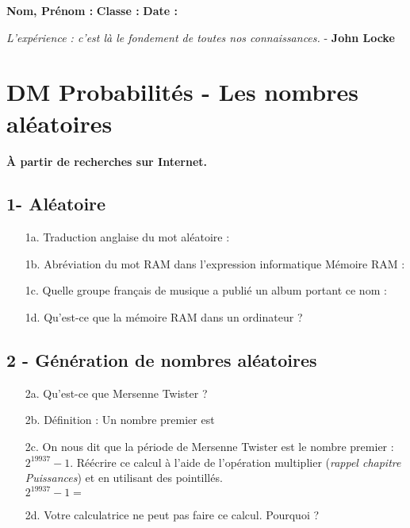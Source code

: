 



\textbf{Nom, Prénom :} \hspace{8cm} \textbf{Classe :} \hspace{3cm} \textbf{Date :}\\

\vspace{-0.8cm}

\begin{center}
  \textit{L’expérience : c’est là le fondement de toutes nos connaissances.}  - \textbf{John Locke}
\end{center}

\vspace{-0.8cm}
\section*{DM Probabilités - Les nombres aléatoires}

\textbf{À partir de recherches sur Internet.}

\subsection*{1- Aléatoire}

\begin{enumerate}
    \item[1a.] Traduction anglaise du mot aléatoire : \dotfill
    \item[1b.] Abréviation du mot RAM dans l'expression informatique Mémoire RAM : \dotfill
    \item[1c.] Quelle groupe français de musique a publié un album portant ce nom : \dotfill
    \item[1d.] Qu’est-ce que la mémoire RAM dans un ordinateur ? \\ \Pointilles[8]
\end{enumerate} 


\subsection*{2 - Génération de nombres aléatoires}

\begin{enumerate}
    \item[2a.] Qu'est-ce que Mersenne Twister ? \\ \Pointilles[8]
    \item[2b.] Définition : Un nombre premier est \dotfill \\ \Pointilles[1]
    \item[2c.] On nous dit que la période de Mersenne Twister est le nombre premier : $2^{19937} - 1$.  Réécrire ce calcul à l'aide de l'opération multiplier (\textit{rappel chapitre Puissances}) et en utilisant des pointillés. \\

    $2^{19937} - 1 = $ \dotfill
    \item[2d.] Votre calculatrice ne peut pas faire ce calcul. Pourquoi ? \\ \Pointilles[2]
\end{enumerate} 

